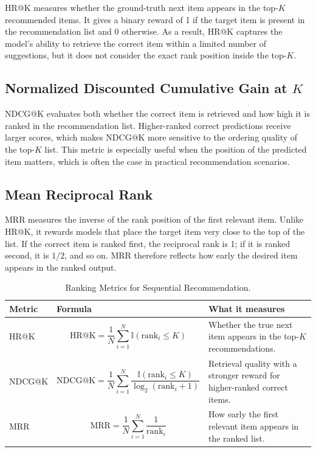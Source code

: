 \documentclass[12pt,a4paper]{report}
\begin{document}
HR@K measures whether the ground-truth next item appears in the top-\(K\)
recommended items. It gives a binary reward of 1 if the target item is present
in the recommendation list and 0 otherwise. As a result, HR@K captures the
model's ability to retrieve the correct item within a limited number of
suggestions, but it does not consider the exact rank position inside the top-\(K\).

\subsection{Normalized Discounted Cumulative Gain at \(K\)}

NDCG@K evaluates both whether the correct item is retrieved and how high it is
ranked in the recommendation list. Higher-ranked correct predictions receive
larger scores, which makes NDCG@K more sensitive to the ordering quality of the
top-\(K\) list. This metric is especially useful when the position of the
predicted item matters, which is often the case in practical recommendation
scenarios.

\subsection{Mean Reciprocal Rank}

MRR measures the inverse of the rank position of the first relevant item.
Unlike HR@K, it rewards models that place the target item very close to the top
of the list. If the correct item is ranked first, the reciprocal rank is 1; if
it is ranked second, it is \(1/2\), and so on. MRR therefore reflects how early
the desired item appears in the ranked output.

\begin{table}[h]
\centering
\begin{tabular}{p{2.5cm} p{5.2cm} p{5.5cm}}
\toprule
\textbf{Metric} & \textbf{Formula} & \textbf{What it measures} \\
\midrule
HR@K &
\[
\mathrm{HR@K} = \frac{1}{N}\sum_{i=1}^{N}\mathbb{I}(\text{rank}_i \leq K)
\]
&
Whether the true next item appears in the top-\(K\) recommendations. \\
\midrule
NDCG@K &
\[
\mathrm{NDCG@K} = \frac{1}{N}\sum_{i=1}^{N}\frac{\mathbb{I}(\text{rank}_i \leq K)}{\log_2(\text{rank}_i + 1)}
\]
&
Retrieval quality with a stronger reward for higher-ranked correct items. \\
\midrule
MRR &
\[
\mathrm{MRR} = \frac{1}{N}\sum_{i=1}^{N}\frac{1}{\text{rank}_i}
\]
&
How early the first relevant item appears in the ranked list. \\
\bottomrule
\end{tabular}
\caption{Ranking Metrics for Sequential Recommendation.}
\label{tab:evaluation_metrics}
\end{table}
\end{document}
